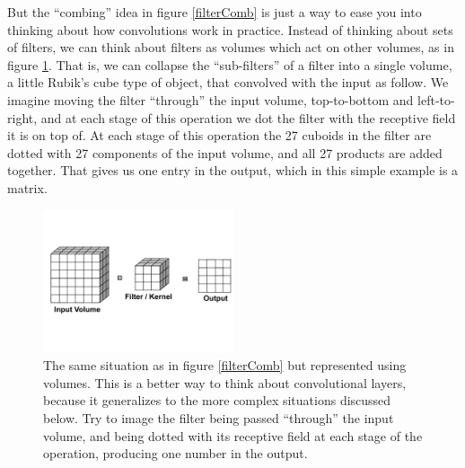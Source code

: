 
But the ``combing'' idea in figure \ref{filterComb} is just a way to ease you into thinking about how convolutions work in practice. Instead of thinking about sets of filters, we can think about filters as volumes which act on other volumes, as in figure \ref{filterToVolume}. That is, we can collapse the ``sub-filters'' of a filter into a single volume, a little Rubik's cube type of object, that convolved with the input as follow. We imagine moving the filter ``through'' the input volume, top-to-bottom and left-to-right, and at each stage of this operation we dot the filter with the receptive field it is on top of. At each stage of this operation the 27 cuboids in the filter are dotted with 27 components of the input volume, and all 27 products are added together. That gives us one entry in the output, which in this simple example is a matrix.

\begin{figure}
\centering
\includegraphics[width=0.5\textwidth]{images/filterToVolume.png}
\caption[Soraya Boza and Jeff Yoshimi.]{The same situation as in figure \ref{filterComb} but represented using volumes. This is a better way to think about convolutional layers, because it generalizes to the more complex situations discussed below. Try to image the filter being passed ``through'' the input volume, and being dotted with its receptive field at each stage of the operation, producing one number in the output.}
\label{filterToVolume}
\end{figure}

